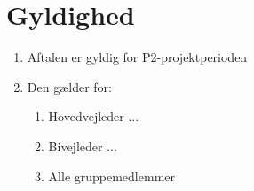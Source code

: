 \section{Gyldighed}
\begin{enumerate}
\item{Aftalen er gyldig for P2-projektperioden}
\item{Den gælder for:}
\begin{enumerate}
\item{Hovedvejleder ...}
\item{Bivejleder ...}
\item{Alle gruppemedlemmer}
\end{enumerate}
\end{enumerate}
